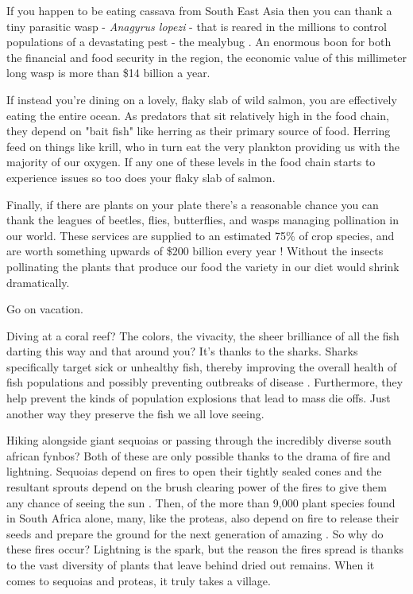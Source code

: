 \documentclass[11pt,a5paper]{book}
\begin{document}
If you happen to be eating cassava from South East Asia then you can thank a tiny parasitic wasp - \textit{Anagyrus lopezi} - that is reared in the millions to control populations of a devastating pest - the mealybug \cite{wpark}. An enormous boon for both the financial and food security in the region, the economic value of this millimeter long wasp is more than \$14 billion a year. 
\newline

If instead you're dining on a lovely, flaky slab of wild salmon, you are effectively eating the entire ocean. As predators that sit relatively high in the food chain, they depend on "bait fish" like herring as their primary source of food. Herring feed on things like krill, who in turn eat the very plankton providing us with the majority of our oxygen. If any one of these levels in the food chain starts to experience issues so too does your flaky slab of salmon. 
\newline

Finally, if there are plants on your plate there's a reasonable chance you can thank the leagues of beetles, flies, butterflies, and wasps managing pollination in our world. These services are supplied to an estimated 75\% of crop species, and are worth something upwards of \$200 billion every year \cite{avanbergen}! Without the insects pollinating the plants that produce our food the variety in our diet would shrink dramatically.
\newline

Go on vacation. 
\newline

Diving at a coral reef? The colors, the vivacity, the sheer brilliance of all the fish darting this way and that around you? It's thanks to the sharks. Sharks specifically target sick or unhealthy fish, thereby improving the overall health of fish populations and possibly preventing outbreaks of disease \cite{reefcause}. Furthermore, they help prevent the kinds of population explosions that lead to mass die offs. Just another way they preserve the fish we all love seeing. 
\newline

Hiking alongside giant sequoias or passing through the incredibly diverse south african fynbos? Both of these are only possible thanks to the drama of fire and lightning. Sequoias depend on fires to open their tightly sealed cones and the resultant sprouts depend on the brush clearing power of the fires to give them any chance of seeing the sun \cite{california}. Then, of the more than 9,000 plant species found in South Africa alone, many, like the proteas, also depend on fire to release their seeds and prepare the ground for the next generation of amazing \cite{shoek}. So why do these fires occur? Lightning is the spark, but the reason the fires spread is thanks to the vast diversity of plants that leave behind dried out remains. When it comes to sequoias and proteas, it truly takes a village. 
\newline
\end{document}
